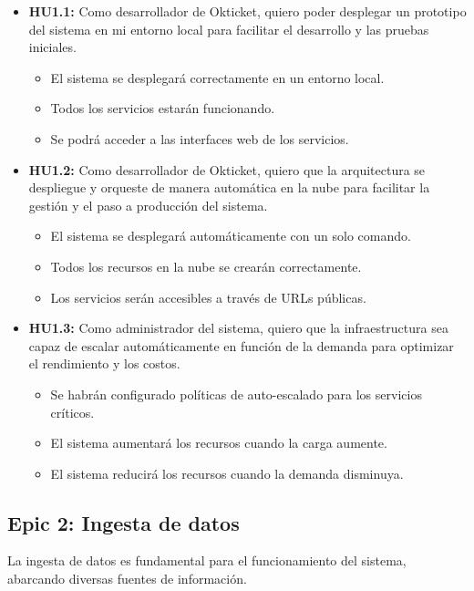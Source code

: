 \begin{itemize}
    \item \textbf{HU1.1:} Como desarrollador de Okticket, quiero poder
    desplegar un prototipo del sistema en mi entorno local para facilitar el
    desarrollo y las pruebas iniciales.
    \begin{itemize}
        \item El sistema se desplegará correctamente en un entorno local.
        \item Todos los servicios estarán funcionando.
        \item Se podrá acceder a las interfaces web de los servicios.
    \end{itemize}

    \item \textbf{HU1.2:} Como desarrollador de Okticket, quiero que la
    arquitectura se despliegue y orqueste de manera automática en la nube para
    facilitar la gestión y el paso a producción del sistema.
    \begin{itemize}
        \item El sistema se desplegará automáticamente con un solo comando.
        \item Todos los recursos en la nube se crearán correctamente.
        \item Los servicios serán accesibles a través de URLs públicas.
    \end{itemize}

    \item \textbf{HU1.3:} Como administrador del sistema, quiero que la
    infraestructura sea capaz de escalar automáticamente en función de la
    demanda para optimizar el rendimiento y los costos.
    \begin{itemize}
        \item Se habrán configurado políticas de auto-escalado para los
        servicios críticos.
        \item El sistema aumentará los recursos cuando la carga aumente.
        \item El sistema reducirá los recursos cuando la demanda disminuya.
    \end{itemize}
\end{itemize}


\newpage{}
\subsection{Epic 2: Ingesta de datos}
La ingesta de datos es fundamental para el funcionamiento del sistema,
abarcando diversas fuentes de información.

